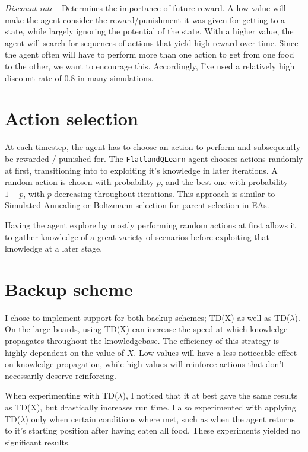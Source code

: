\documentclass[twoside]{article}
\begin{document}
\begin{multicols}{2}
    \textit{Discount rate} - Determines the importance of future reward.
    A low value will make the agent consider the reward/punishment it was given for getting to a state, while largely ignoring the potential of the state.
    With a higher value, the agent will search for sequences of actions that yield high reward over time.
    Since the agent often will have to perform more than one action to get from one food to the other, we want to encourage this.
    Accordingly, I've used a relatively high discount rate of $0.8$ in many simulations.
    

    \section{Action selection}

    At each timestep, the agent has to choose an action to perform and subsequently be rewarded / punished for.
    The \texttt{FlatlandQLearn}-agent chooses actions randomly at first, transitioning into to exploiting it's knowledge in later iterations.
    A random action is chosen with probability $p$, and the best one with probability $1 - p$, with $p$ decreasing throughout iterations.
    This approach is similar to Simulated Annealing or Boltzmann selection for parent selection in EAs.
    
    Having the agent explore by mostly performing random actions at first allows it to gather knowledge of a great variety of scenarios before exploiting that knowledge at a later stage.

    \section{Backup scheme}

    I chose to implement support for both backup schemes; TD(X) as well as TD($\lambda$).
    On the large boards, using TD(X) can increase the speed at which knowledge propagates throughout the knowledgebase.
    The efficiency of this strategy is highly dependent on the value of $X$.
    Low values will have a less noticeable effect on knowledge propagation, while high values will reinforce actions that don't necessarily deserve reinforcing.
    
    When experimenting with TD($\lambda$), I noticed that it at best gave the same results as TD(X), but drastically increases run time.
    I also experimented with applying TD($\lambda$) only when certain conditions where met, such as when the agent returns to it's starting position after having eaten all food.
    These experiments yielded no significant results.
    


\end{multicols}

%
%
\end{document}
